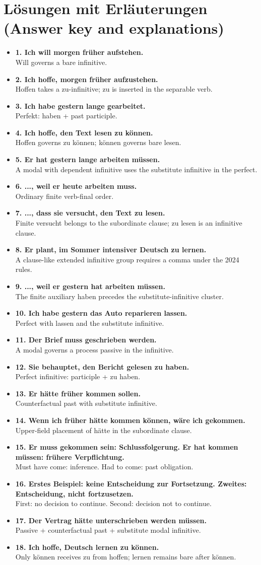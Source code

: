 \documentclass[a4paper,11pt]{article}
\newcommand{\ExampleItem}[2]{\item \textbf{#1}\\{\small\color{SoftGray}#2}}
\newcommand{\Pair}[2]{\ExampleItem{#1}{#2}}
\begin{document}
\section{Lösungen mit Erläuterungen \textnormal{(Answer key and explanations)}}
\begin{exbox}\begin{itemize}
\Pair{1. Ich will morgen früher aufstehen.}{Will governs a bare infinitive.}
\Pair{2. Ich hoffe, morgen früher aufzustehen.}{Hoffen takes a zu-infinitive; zu is inserted in the separable verb.}
\Pair{3. Ich habe gestern lange gearbeitet.}{Perfekt: haben + past participle.}
\Pair{4. Ich hoffe, den Text lesen zu können.}{Hoffen governs zu können; können governs bare lesen.}
\Pair{5. Er hat gestern lange arbeiten müssen.}{A modal with dependent infinitive uses the substitute infinitive in the perfect.}
\Pair{6. ..., weil er heute arbeiten muss.}{Ordinary finite verb-final order.}
\Pair{7. ..., dass sie versucht, den Text zu lesen.}{Finite versucht belongs to the subordinate clause; zu lesen is an infinitive clause.}
\Pair{8. Er plant, im Sommer intensiver Deutsch zu lernen.}{A clause-like extended infinitive group requires a comma under the 2024 rules.}
\Pair{9. ..., weil er gestern hat arbeiten müssen.}{The finite auxiliary haben precedes the substitute-infinitive cluster.}
\Pair{10. Ich habe gestern das Auto reparieren lassen.}{Perfect with lassen and the substitute infinitive.}
\Pair{11. Der Brief muss geschrieben werden.}{A modal governs a process passive in the infinitive.}
\Pair{12. Sie behauptet, den Bericht gelesen zu haben.}{Perfect infinitive: participle + zu haben.}
\Pair{13. Er hätte früher kommen sollen.}{Counterfactual past with substitute infinitive.}
\Pair{14. Wenn ich früher hätte kommen können, wäre ich gekommen.}{Upper-field placement of hätte in the subordinate clause.}
\Pair{15. Er muss gekommen sein: Schlussfolgerung. Er hat kommen müssen: frühere Verpflichtung.}{Must have come: inference. Had to come: past obligation.}
\Pair{16. Erstes Beispiel: keine Entscheidung zur Fortsetzung. Zweites: Entscheidung, nicht fortzusetzen.}{First: no decision to continue. Second: decision not to continue.}
\Pair{17. Der Vertrag hätte unterschrieben werden müssen.}{Passive + counterfactual past + substitute modal infinitive.}
\Pair{18. Ich hoffe, Deutsch lernen zu können.}{Only können receives zu from hoffen; lernen remains bare after können.}
\end{itemize}\end{exbox}
\end{document}

